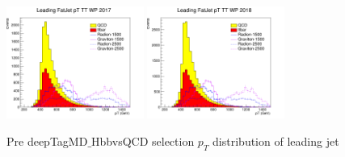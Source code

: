 \begin{figure}[!htb]
	\includegraphics[width=0.4\textwidth]{Figures/pt0TT_17_deepTagMD_HbbvsQCD.png}
	\includegraphics[width=0.4\textwidth]{Figures/pt0TT_18_deepTagMD_HbbvsQCD.png}
	\caption{Pre deepTagMD$\_$HbbvsQCD selection $p_T$ distribution of leading jet}
	\label{fig:prePtleadBY}
\end{figure}
